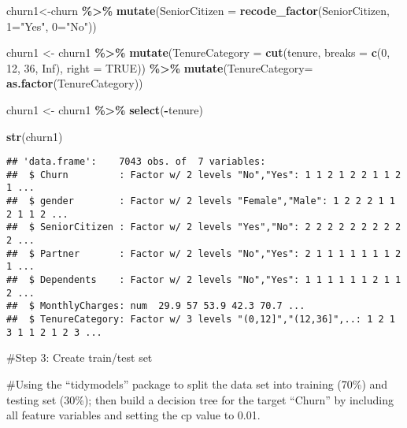 \documentclass[
]{article}
\newenvironment{Shaded}{\begin{snugshade}}{\end{snugshade}}
\newcommand{\AttributeTok}[1]{\textcolor[rgb]{0.13,0.29,0.53}{#1}}
\newcommand{\ConstantTok}[1]{\textcolor[rgb]{0.56,0.35,0.01}{#1}}
\newcommand{\DecValTok}[1]{\textcolor[rgb]{0.00,0.00,0.81}{#1}}
\newcommand{\FunctionTok}[1]{\textcolor[rgb]{0.13,0.29,0.53}{\textbf{#1}}}
\newcommand{\NormalTok}[1]{#1}
\newcommand{\OtherTok}[1]{\textcolor[rgb]{0.56,0.35,0.01}{#1}}
\newcommand{\SpecialCharTok}[1]{\textcolor[rgb]{0.81,0.36,0.00}{\textbf{#1}}}
\newcommand{\StringTok}[1]{\textcolor[rgb]{0.31,0.60,0.02}{#1}}
\begin{document}
\begin{Shaded}
\begin{Highlighting}[]
\NormalTok{churn1}\OtherTok{\textless{}{-}}\NormalTok{churn }\SpecialCharTok{\%\textgreater{}\%}
  \FunctionTok{mutate}\NormalTok{(}\AttributeTok{SeniorCitizen =} \FunctionTok{recode\_factor}\NormalTok{(SeniorCitizen,}
                                       \StringTok{\textquotesingle{}1\textquotesingle{}}\OtherTok{=}\StringTok{"Yes"}\NormalTok{,}
                                       \StringTok{\textquotesingle{}0\textquotesingle{}}\OtherTok{=}\StringTok{"No"}\NormalTok{))}

\NormalTok{churn1 }\OtherTok{\textless{}{-}}\NormalTok{ churn1 }\SpecialCharTok{\%\textgreater{}\%}
  \FunctionTok{mutate}\NormalTok{(}\AttributeTok{TenureCategory =} \FunctionTok{cut}\NormalTok{(tenure,}
                              \AttributeTok{breaks =} \FunctionTok{c}\NormalTok{(}\DecValTok{0}\NormalTok{, }\DecValTok{12}\NormalTok{, }\DecValTok{36}\NormalTok{, }\ConstantTok{Inf}\NormalTok{),}
                              \AttributeTok{right =} \ConstantTok{TRUE}\NormalTok{)) }\SpecialCharTok{\%\textgreater{}\%}
\FunctionTok{mutate}\NormalTok{(}\AttributeTok{TenureCategory=} \FunctionTok{as.factor}\NormalTok{(TenureCategory))}

\NormalTok{churn1 }\OtherTok{\textless{}{-}}\NormalTok{ churn1 }\SpecialCharTok{\%\textgreater{}\%}
  \FunctionTok{select}\NormalTok{(}\SpecialCharTok{{-}}\NormalTok{tenure)}


\FunctionTok{str}\NormalTok{(churn1)}
\end{Highlighting}
\end{Shaded}

\begin{verbatim}
## 'data.frame':    7043 obs. of  7 variables:
##  $ Churn         : Factor w/ 2 levels "No","Yes": 1 1 2 1 2 2 1 1 2 1 ...
##  $ gender        : Factor w/ 2 levels "Female","Male": 1 2 2 2 1 1 2 1 1 2 ...
##  $ SeniorCitizen : Factor w/ 2 levels "Yes","No": 2 2 2 2 2 2 2 2 2 2 ...
##  $ Partner       : Factor w/ 2 levels "No","Yes": 2 1 1 1 1 1 1 1 2 1 ...
##  $ Dependents    : Factor w/ 2 levels "No","Yes": 1 1 1 1 1 1 2 1 1 2 ...
##  $ MonthlyCharges: num  29.9 57 53.9 42.3 70.7 ...
##  $ TenureCategory: Factor w/ 3 levels "(0,12]","(12,36]",..: 1 2 1 3 1 1 2 1 2 3 ...
\end{verbatim}

\#Step 3: Create train/test set

\#Using the ``tidymodels'' package to split the data set into training
(70\%) and testing set (30\%); then build a decision tree for the target
``Churn'' by including all feature variables and setting the cp value to
0.01.
\end{document}

